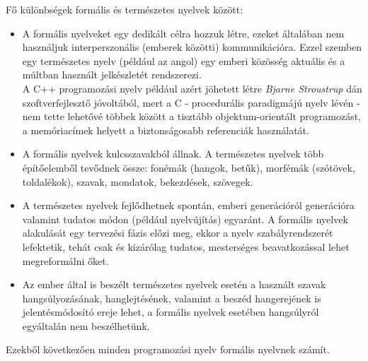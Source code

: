 \documentclass[tocnopagenum]{thesis-ekf}
\theoremstyle{definition}
\theoremstyle{remark}
\begin{document}
	Fő különbségek formális és természetes nyelvek között:
	\begin{itemize}
		\item A formális nyelveket egy dedikált célra hozzuk létre, ezeket általában nem használjuk interperszonális (emberek közötti) kommunikációra. Ezzel szemben egy természetes nyelv (például az angol) egy emberi közösség aktuális és a múltban használt jelkészletét rendszerezi.\\
		A C++ programozási nyelv például azért jöhetett létre \textit{Bjarne Stroustrup} dán szoftverfejlesztő jóvoltából, mert a C - procedurális paradigmájú nyelv lévén - nem tette lehetővé többek között a tisztább objektum-orientált programozást, a memóriacímek helyett a biztonságosabb referenciák használatát. \cite{cpplang1}
		\item A formális nyelvek kulcsszavakból állnak. A természetes nyelvek több építőelemből tevődnek össze: fonémák (hangok, betűk), morfémák (szótövek, toldalékok), szavak, mondatok, bekezdések, szövegek.
		\item A természetes nyelvek fejlődhetnek spontán, emberi generációról generációra valamint tudatos módon (például nyelvújítás) egyaránt. A formális nyelvek alakulását egy tervezési fázis előzi meg, ekkor a nyelv szabályrendszerét lefektetik, tehát csak és kizárólag tudatos, mesterséges beavatkozással lehet megreformálni őket.
		\item Az ember által is beszélt természetes nyelvek esetén a használt szavak hangsúlyozásának, hanglejtésének, valamint a beszéd hangerejének is jelentésmódosító ereje lehet, a formális nyelvek esetében hangsúlyról egyáltalán nem beszélhetünk.
	\end{itemize} \cite{langvid1} \cite{langvid2}
	Ezekből következően minden programozási nyelv formális nyelvnek számít.
\end{document}
